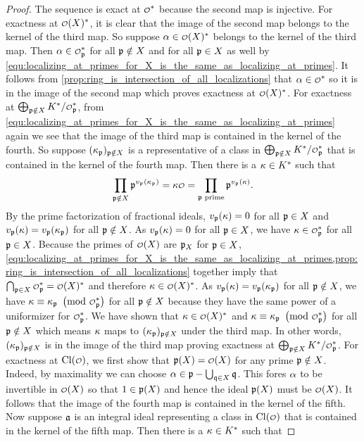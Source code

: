     \begin{proof}
      The sequence is exact at $\smc{O}^{\ast}$ because the second map is injective. For exactness at $\smc{O}(X)^{\ast}$, it is clear that the image of the second map belongs to the kernel of the third map. So suppose $\a \in \smc{O}(X)^{\ast}$ belongs to the kernel of the third map. Then $\a \in \smc{O}_{\mf{p}}^{\ast}$ for all $\mathfrak{p} \notin X$ and for all $\mathfrak{p} \in X$ as well by \cref{equ:localizing_at_primes_for_X_is_the_same_as_localizing_at_primes}. It follows from \cref{prop:ring_is_intersection_of_all_localizations} that $\a \in \smc{O}^{\ast}$ so it is in the image of the second map which proves exactness at $\smc{O}(X)^{\ast}$. For exactness at $\bigoplus_{\mf{p} \notin X}K^{\ast}/\smc{O}_{\mf{p}}^{\ast}$, from \cref{equ:localizing_at_primes_for_X_is_the_same_as_localizing_at_primes} again we see that the image of the third map is contained in the kernel of the fourth. So suppose $(\kappa_{\mathfrak{p}})_{\mathfrak{p} \notin X}$ is a representative of a class in $\bigoplus_{\mf{p} \notin X}K^{\ast}/\smc{O}_{\mf{p}}^{\ast}$ that is contained in the kernel of the fourth map. Then there is a $\kappa \in K^{\ast}$ such that
      \[
        \prod_{\mf{p} \notin X}\mf{p}^{v_{\mf{p}}(\k_{\mf{p}})} = \k\smc{O} = \prod_{\text{$\mf{p}$ prime}}\mf{p}^{v_{\mf{p}}(\k)}.
      \]
      By the prime factorization of fractional ideals, $v_{\mathfrak{p}}(\kappa) = 0$ for all $\mathfrak{p} \in X$ and $v_{\mathfrak{p}}(\kappa) = v_{\mathfrak{p}}(\kappa_{\mathfrak{p}})$ for all $\mathfrak{p} \notin X$. As $v_{\mathfrak{p}}(\kappa) = 0$ for all $\mathfrak{p} \in X$, we have $\k \in \smc{O}_{\mf{p}}^{\ast}$ for all $\mathfrak{p} \in X$. Because the primes of $\smc{O}(X)$ are $\mathfrak{p}_{X}$ for $\mathfrak{p} \in X$, \cref{equ:localizing_at_primes_for_X_is_the_same_as_localizing_at_primes,prop:ring_is_intersection_of_all_localizations} together imply that $\bigcap_{\mf{p} \in X}\smc{O}_{\mf{p}}^{\ast} = \smc{O}(X)^{\ast}$ and therefore $\k \in \smc{O}(X)^{\ast}$. As $v_{\mathfrak{p}}(\kappa) = v_{\mathfrak{p}}(\kappa_{\mathfrak{p}})$ for all $\mathfrak{p} \notin X$, we have $\k \equiv \k_{\mf{p}} \tmod{\smc{O}_{\mf{p}}^{\ast}}$ for all $\mathfrak{p} \notin X$ because they have the same power of a uniformizer for $\smc{O}_{\mf{p}}^{\ast}$. We have shown that $\k \in \smc{O}(X)^{\ast}$ and $\k \equiv \k_{\mf{p}} \tmod{\smc{O}_{\mf{p}}^{\ast}}$ for all $\mathfrak{p} \notin X$ which means $\kappa$ maps to $(\kappa_{\mathfrak{p}})_{\mathfrak{p} \notin X}$ under the third map. In other words, $(\kappa_{\mathfrak{p}})_{\mathfrak{p} \notin X}$ is in the image of the third map proving exactness at $\bigoplus_{\mf{p} \notin X}K^{\ast}/\smc{O}_{\mf{p}}^{\ast}$. For exactness at $\Cl(\smc{O})$, we first show that $\mf{p}(X) = \smc{O}(X)$ for any prime $\mathfrak{p} \notin X$. Indeed, by maximality we can choose $\alpha \in \mathfrak{p}-\bigcup_{\mathfrak{q} \in X}\mathfrak{q}$. This fores $\alpha$ to be invertible in $\smc{O}(X)$ so that $1 \in \mathfrak{p}(X)$ and hence the ideal $\mathfrak{p}(X)$ must be $\smc{O}(X)$. It follows that the image of the fourth map is contained in the kernel of the fifth. Now suppose $\mathfrak{a}$ is an integral ideal representing a class in $\Cl(\smc{O})$ that is contained in the kernel of the fifth map. Then there is a $\kappa \in K^{\ast}$ such that

\end{proof}
